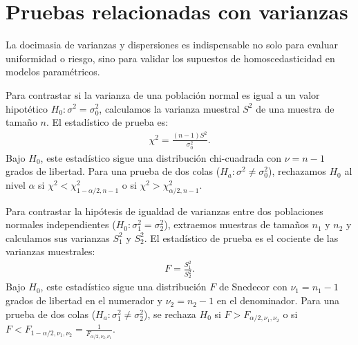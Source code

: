 \section{Pruebas relacionadas con varianzas}

La docimasia de varianzas y dispersiones es indispensable no solo para evaluar uniformidad o riesgo, sino para validar los supuestos de homoscedasticidad en modelos paramétricos.

\begin{teorema}
	Para contrastar si la varianza de una población normal es igual a un valor hipotético $H_0: \sigma^2 = \sigma_0^2$, calculamos la varianza muestral $S^2$ de una muestra de tamaño $n$. El estadístico de prueba es:
	\begin{align}
		\chi^2 = \frac{(n-1)S^2}{\sigma_0^2}.
	\end{align}
	Bajo $H_0$, este estadístico sigue una distribución chi-cuadrada con $\nu = n - 1$ grados de libertad.
	Para una prueba de dos colas ($H_a: \sigma^2 \neq \sigma_0^2$), rechazamos $H_0$ al nivel $\alpha$ si $\chi^2 < \chi^2_{1-\alpha/2, n-1}$ o si $\chi^2 > \chi^2_{\alpha/2, n-1}$.
\end{teorema}

\begin{teorema}
	Para contrastar la hipótesis de igualdad de varianzas entre dos poblaciones normales independientes ($H_0: \sigma_1^2 = \sigma_2^2$), extraemos muestras de tamaños $n_1$ y $n_2$ y calculamos sus varianzas $S_1^2$ y $S_2^2$. El estadístico de prueba es el cociente de las varianzas muestrales:
	\begin{align}
		F = \frac{S_1^2}{S_2^2}.
	\end{align}
	Bajo $H_0$, este estadístico sigue una distribución $F$ de Snedecor con $\nu_1 = n_1 - 1$ grados de libertad en el numerador y $\nu_2 = n_2 - 1$ en el denominador.
	Para una prueba de dos colas ($H_a: \sigma_1^2 \neq \sigma_2^2$), se rechaza $H_0$ si $F > F_{\alpha/2, \nu_1, \nu_2}$ o si $F < F_{1-\alpha/2, \nu_1, \nu_2} = \frac{1}{F_{\alpha/2, \nu_2, \nu_1}}$.
\end{teorema}
